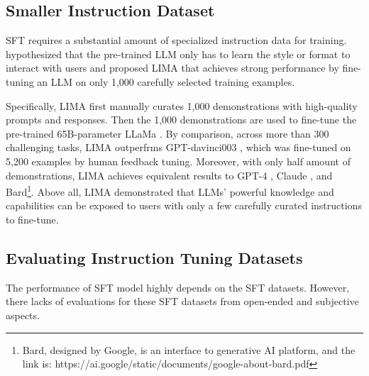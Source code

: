 \documentclass[11pt]{article}
\begin{document}
\subsection{Smaller Instruction Dataset}
SFT  requires a substantial amount of specialized instruction data for training. \citet{Zhou2023LIMALI} hypothesized  that the pre-trained LLM only has to learn the style or format to interact with users and proposed LIMA that achieves  strong performance by  fine-tuning an LLM on only 1,000 carefully selected training examples.

Specifically, LIMA first manually curates 1,000 demonstrations with high-quality prompts and responses. Then the 1,000 demonstrations are used to fine-tune the pre-trained 65B-parameter LLaMa  \cite{touvron2023llama}. By comparison, across more than 300 challenging tasks, LIMA outperfrms GPT-davinci003 \cite{Brown2020LanguageMA}, which was fine-tuned on 5,200 examples by human feedback tuning. Moreover, with only half amount of demonstrations, LIMA achieves equivalent results to GPT-4 \cite{OpenAI2023GPT4TR}, Claude \cite{bai2022constitutional}, and Bard\footnote{Bard, designed by Google, is an interface to generative AI platform, and the link is: https://ai.google/static/documents/google-about-bard.pdf}.
Above all, LIMA demonstrated that LLMs' powerful knowledge and capabilities can be exposed to users with only a few carefully curated instructions to fine-tune. 

\subsection{Evaluating  Instruction Tuning Datasets}
The performance of SFT model highly depends on the SFT datasets. 
However, 
there lacks of evaluations for these SFT datasets from open-ended and subjective aspects.
\end{document}
